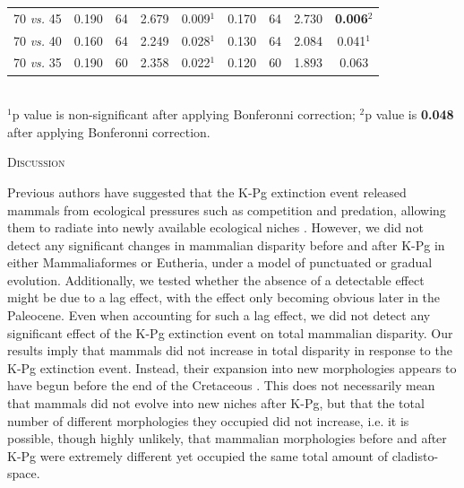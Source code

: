 \documentclass[12pt,letterpaper]{article}
\renewcommand{\section}[1]{%
\bigskip
\begin{center}
\begin{Large}
\normalfont\scshape #1
\medskip
\end{Large}
\end{center}}
\begin{document}
\begin{table}[ht]
\begin{tabular}{c|cccc|cccc}
  70 \textit{vs.} 45 & 0.190 & 64 & 2.679 & 0.009$^1$ & 0.170 & 64 & 2.730 & \textbf{0.006}$^2$ \\ 
  70 \textit{vs.} 40 & 0.160 & 64 & 2.249 & 0.028$^1$ & 0.130 & 64 & 2.084 & 0.041$^1$ \\ 
  70 \textit{vs.} 35 & 0.190 & 60 & 2.358 & 0.022$^1$ & 0.120 & 60 & 1.893 & 0.063 \\ 
   \hline
\end{tabular} \\
   \small{$^1$p value is non-significant after applying Bonferonni correction;
   $^2$p value is \textbf{0.048} after applying Bonferonni correction.}
\end{table}



%
%

\section{Discussion}
Previous authors have suggested that the K-Pg extinction event released mammals from ecological pressures such as competition and predation, allowing them to radiate into newly available ecological niches \citep{archibald2011extinction,OLeary08022013,Lovergrove,Slater2012MEE}.
However, we did not detect any significant changes in mammalian disparity before and after K-Pg in either Mammaliaformes or Eutheria, under a model of punctuated or gradual evolution.
Additionally, we tested whether the absence of a detectable effect might be due to a lag effect, with the effect only becoming obvious later in the Paleocene.
Even when accounting for such a lag effect, we did not detect any significant effect of the K-Pg extinction event on total mammalian disparity.
Our results imply that mammals did not increase in total disparity in response to the K-Pg extinction event.
Instead, their expansion into new morphologies appears to have begun before the end of the Cretaceous \citep[Figure \ref{fig:Fig_Raw_results}, Table \ref{tab:Tab_results} and see ][]{meredithimpacts2011,dosReis2014,Close2015,Lee2015R759}.
This does not necessarily mean that mammals did not evolve into new niches after K-Pg, but that the total number of different morphologies they occupied did not increase, i.e. it is possible, though highly unlikely, that mammalian morphologies before and after K-Pg were extremely different yet occupied the same total amount of cladisto-space.
\end{document}
